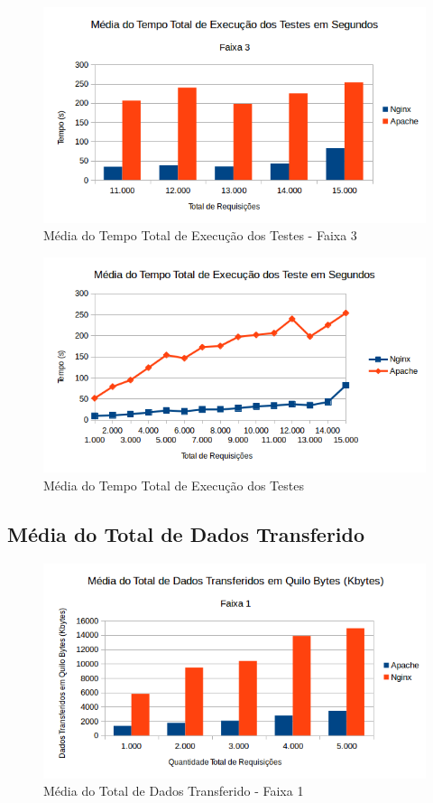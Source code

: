 \begin{figure}[H]
	\centering
	\includegraphics[width=1\linewidth]{graficos/grafico1-f3} 
	\caption{Média do Tempo Total de Execução dos Testes - Faixa 3}
	\label{fig:grafico1-f3}
\end{figure}

\begin{figure}[H]
	\centering
	\includegraphics[width=1\linewidth]{graficos/grafico1} 
	\caption{Média do Tempo Total de Execução dos Testes}
	\label{fig:grafico1}
\end{figure}

\subsection{Média do Total de Dados Transferido}
\begin{figure}[H]
	\centering
	\includegraphics[width=1\linewidth]{graficos/grafico2-f1} 
	\caption{Média do Total de Dados Transferido - Faixa 1}
	\label{fig:grafico2-f1}
\end{figure}


